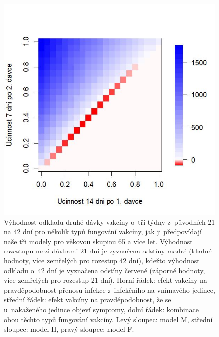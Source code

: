 \begin{figure}[p]
\begin{center}
\begin{minipage}[m]{0.3\linewidth}
		\end{minipage}
		\begin{minipage}[m]{0.3\linewidth}
			\includegraphics[width=\textwidth]{pic/SAM_DIFF_mean_T.jpg}
		\end{minipage}
	\end{center}
	\caption{Výhodnost odkladu druhé dávky vakcíny o~tři týdny z~původních 21 na 42 dní pro několik typů fungování vakcíny, jak ji předpovídají naše tři modely pro věkovou skupinu 65 a více let. Výhodnost rozestupu mezi dávkami 21 dní je vyznačena odstíny modré (kladné hodnoty, více zemřelých pro rozestup 42 dní), kdežto výhodnost odkladu o~42 dní je vyznačena odstíny červené (záporné hodnoty, více zemřelých pro rozestup 21 dní). Horní řádek: efekt vakcíny na pravděpodobnost přenosu infekce z~infekčního na vnímavého jedince, střední řádek: efekt vakcíny na pravděpodobnost, že se u~nakaženého jedince objeví symptomy, dolní řádek: kombinace obou těchto typů fungování vakcíny. Levý sloupec: model M, střední sloupec: model H, pravý sloupec: model F.}
	\label{figvacc1}
\end{figure}

